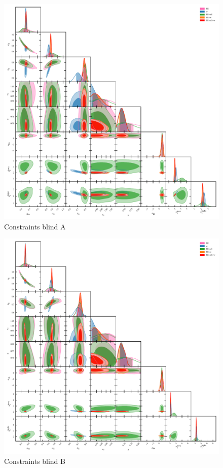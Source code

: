 \begin{figure}
	\begin{center}
		\includegraphics[width=\textwidth]{Parameter_Plots/omegam_sigma8_s8_ns_h_a_ia_b1l_b1h_blind_A}
		\caption{Constraints blind A}
		\label{fig:cosmology-params}
	\end{center}
\end{figure}

\begin{figure}
	\begin{center}
		\includegraphics[width=\textwidth]{Parameter_Plots/omegam_sigma8_s8_ns_h_a_ia_b1l_b1h_blind_B}
		\caption{Constraints blind B}
		\label{fig:cosmology-params}
	\end{center}
\end{figure}

